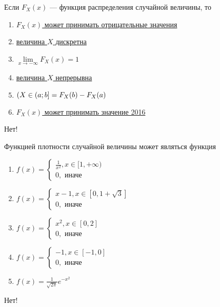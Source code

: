 \documentclass[t]{beamer}
\let\P\relax
\DeclareMathOperator{\P}{\mathbb{P}}
\begin{document}
 \begin{frame} \label{9-No} 
\begin{block}{9} 

  Если $F_X(x)$ — функция распределения случайной величины, то
  


 \end{block} 
\begin{enumerate} 
\item[] \hyperlink{9-No}{\beamergotobutton{} $F_X(x)$ может принимать отрицательные значения}
\item[] \hyperlink{9-No}{\beamergotobutton{} величина $X$ дискретна}
\item[] \hyperlink{9-No}{\beamergotobutton{} $\lim\limits_{x \rightarrow -\infty} F_X(x) = 1 $}
\item[] \hyperlink{9-No}{\beamergotobutton{} величина $X$ непрерывна}
\item[] \hyperlink{9-Yes}{\beamergotobutton{}  $\P(X \in (a;b] = F_X(b) - F_X(a)$}
\item[] \hyperlink{9-No}{\beamergotobutton{} $F_X(x)$ может принимать значение 2016}
\end{enumerate} 

 \alert{Нет!} 
\end{frame} 


 \begin{frame} \label{10-No} 
\begin{block}{10} 

Функцией плотности случайной величины может являться функция
  


 \end{block} 
\begin{enumerate} 
\item[] \hyperlink{10-Yes}{\beamergotobutton{} $f(x) = \begin{cases}
	\frac{1}{x^2}, x \in [1,+ \infty) \\
	0,\text{ иначе}
	\end{cases}$}
\item[] \hyperlink{10-No}{\beamergotobutton{} $ f(x) = \begin{cases}
	x - 1, x \in [0,1+\sqrt{3}] \\
	0,\text{ иначе}
	\end{cases}$}
\item[] \hyperlink{10-No}{\beamergotobutton{} $ f(x) = \begin{cases}
	x^2, x \in [0,2] \\
	0,\text{ иначе}
	\end{cases}$}
\item[] \hyperlink{10-No}{\beamergotobutton{} $ f(x) = \begin{cases}
	-1, x \in [-1, 0] \\
	0,\text{ иначе}
	\end{cases}$}
\item[] \hyperlink{10-No}{\beamergotobutton{} $ f(x) = \frac{1}{\sqrt{2\pi}} e^{-x^2}$}
\end{enumerate} 

 \alert{Нет!} 
\end{frame} 
\end{document}

